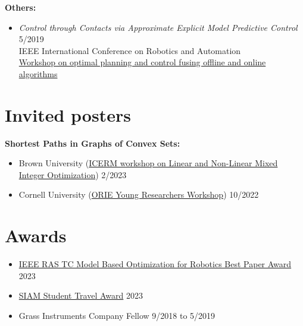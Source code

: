 \documentclass[11pt,a4paper,sans]{moderncv}
\begin{document}
\vspace{5pt}

\textbf{Others:}

\vspace{5pt}

\begin{itemize}

\item \textit{Control through Contacts via Approximate Explicit Model Predictive Control} \hfill 5/2019 \\
IEEE International Conference on Robotics and Automation \\
\href{https://sites.google.com/mit.edu/icra19ws/speakers?authuser=0}{\color{cyan}Workshop  on optimal planning and control fusing offline and online algorithms}

\end{itemize}

\section{Invited posters}

\vspace{5pt}

\textbf{Shortest Paths in Graphs of Convex Sets:}

\vspace{5pt}

\begin{itemize}

\item
Brown University
(\href{https://icerm.brown.edu/programs/sp-s23/w1/}{\color{cyan}ICERM workshop on Linear and Non-Linear Mixed Integer Optimization})
\hfill 2/2023

\item
Cornell University
(\href{https://www.orie.cornell.edu/orie-events/young-researchers-workshop}{\color{cyan}ORIE Young Researchers Workshop})
\hfill 10/2022

\end{itemize}

\section{Awards}

\vspace{5pt}

\begin{itemize}
\item \href{https://www.tcoptrob.org/news/2024-06-12-best-paper/}{\color{cyan}IEEE RAS TC Model Based Optimization for Robotics Best Paper Award} \hfill 2023
\item  \href{https://www.siam.org/conferences/conference-support/siam-student-travel-awards}{\color{cyan}SIAM Student Travel Award} \hfill 2023
\item Grass Instruments Company Fellow \hfill 9/2018 to 5/2019
\end{itemize}
\end{document}
